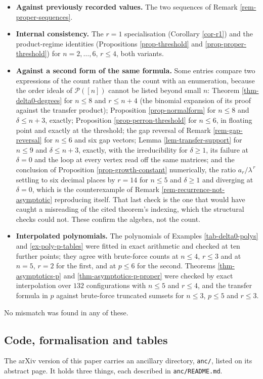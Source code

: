 \documentclass[11pt, a4paper, abstract=yes]{scrartcl}
\theoremstyle{definition}
\theoremstyle{remark}
\theoremstyle{plain}
\begin{document}
\begin{itemize}
\item \textbf{Against previously recorded values.} The two sequences of Remark \ref{rem-proper-sequences}.
\item \textbf{Internal consistency.} The \(r=1\) specialisation (Corollary \ref{cor-r1}) and the product-regime
identities (Propositions \ref{prop-threshold} and \ref{prop-proper-threshold}) for \(n=2,\dots,6\),
\(r\le4\), both variants.
\item \textbf{Against a second form of the same formula.} Some entries compare two expressions of the count
rather than the count with an enumeration, because the order ideals of \(\mathcal P([n])\) cannot
be listed beyond small \(n\): Theorem \ref{thm-delta0-degrees} for \(n\le8\) and \(r\le n+4\) (the
binomial expansion of its proof against the transfer product); Proposition \ref{prop-normalform} for
\(n\le8\) and \(\delta\le n+3\), exactly; Proposition \ref{prop-perron-threshold} for \(n\le6\), in
floating point and exactly at the threshold; the gap reversal of Remark \ref{rem-gap-reversal}
for \(n\le6\) and six gap vectors; Lemma \ref{lem-transfer-support} for \(n\le9\) and
\(\delta\le n+3\), exactly, with the irreducibility for \(\delta\ge1\), its failure at
\(\delta=0\) and the loop at every vertex read off the same matrices; and the conclusion of
Proposition \ref{prop-growth-constant} numerically, the ratio \(a_r/\lambda^{\,r}\) settling to six
decimal places by \(r=14\) for \(n\le5\) and \(\delta\ge1\) and diverging at \(\delta=0\), which
is the counterexample of Remark \ref{rem-recurrence-not-asymptotic} reproducing itself. That last
check is the one that would have caught a misreading of the cited theorem's indexing, which the
structural checks could not. These confirm the algebra, not the count.
\item \textbf{Interpolated polynomials.} The polynomials of Examples \ref{tab-delta0-polys} and
\ref{ex-poly-p-tables} were fitted in exact arithmetic and checked at ten further points; they agree
with brute-force counts at \(n\le4\), \(r\le3\) and at \(n=5\), \(r=2\) for the first, and at
\(p\le6\) for the second. Theorems \ref{thm-asymptotics-p} and \ref{thm-asymptotics-p-proper} were
checked by exact interpolation over \(132\) configurations with \(n\le5\) and \(r\le4\), and the
transfer formula in \(p\) against brute-force truncated sumsets for \(n\le3\), \(p\le5\) and
\(r\le3\).
\end{itemize}

No mismatch was found in any of these.
\subsection{Code, formalisation and tables}
\label{sec-availability}
The arXiv version of this paper carries an ancillary directory, \texttt{anc/}, listed on its abstract
page. It holds three things, each described in \texttt{anc/README.md}.
\end{document}
